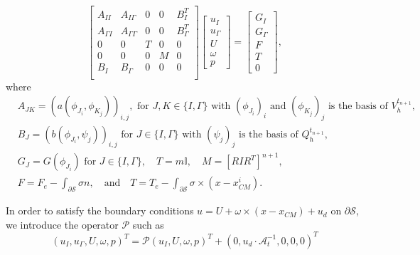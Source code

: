 \documentclass[graybox]{svmult}
\newcommand{\Vel}{u} %
\newcommand{\Pres}{p} %
\newcommand{\tvel}{U} %
\newcommand{\angvel}{\omega} %
\newcommand{\CenterMassi}{x_{CM}^i}
\newcommand{\Solid}{\mathcal{S}} %
\newcommand{\normal}{n} %
\begin{document}
\begin{equation}
	\begin{bmatrix}
		A_{II} & A_{I\Gamma} & 0 & 0 & B_{I}^T  \\
		A_{\Gamma I} & A_{\Gamma \Gamma}  & 0 & 0 & B_{\Gamma}^T\\
		0 & 0 & T
		& 0 & 0 \\
		0 & 0 & 0& M
		& 0\\
		B_I & B_\Gamma & 0 & 0 & 0   \\
	\end{bmatrix}
	\begin{bmatrix}
		\Vel_I \\ \Vel_\Gamma \\ \tvel \\ \angvel \\ \Pres 
	\end{bmatrix} 
	= 
	\begin{bmatrix}
		G_I \\
		G_{\Gamma}\\
		F
		\\
		T
		\\
		0
	\end{bmatrix},
	\label{Eq:flu-rig-block}
\end{equation} 
\color{black}
where
\begin{align*}
&A_{JK} =	(a(\phi_{J_{i}},\phi_{K_{j}}))_{i,j},   \textrm{ for } J,K \in \{I,\Gamma\}  \textrm{ with $(\phi_{J_{i}})_i$ and $( \phi_{K_{j}} )_j$ is the basis of $V_h^{t_{n+1}}$},\\
&B_J = (b(\phi_{J_{i}},\psi_{j}))_{i,j} \textrm{ for } J \in \{I,\Gamma\} \textrm{ with $(\psi_j)_j$ is the basis of $Q_h^{t_{n+1}}$},\\
&G_J = G(\phi_{J_{i}}) \textrm{ for } J \in \{I,\Gamma\}, \quad T = m\mathbb{I}, \quad M = [RIR^T]^{n+1},\\
&F = F_e - \int_{\partial \Solid} \sigma \normal, \quad \textrm{and} \quad T = T_e -\int_{\partial \Solid} \sigma \times (x-\CenterMassi).
\end{align*}



In order to satisfy the boundary conditions $\Vel = \tvel+ \angvel \times (x-x_{CM}) + u_d$ on  $\partial \Solid$, we introduce the operator $\mathcal{P}$ such as 
\begin{equation}
\label{eq:boundary_constraint}
 (\Vel_I,\Vel_\Gamma,\tvel,\angvel,p)^T = \mathcal{P}	(\Vel_I,\tvel,\angvel,p)^T + (0,u_d\cdot\mathcal{A}_t^{-1},0,0,0)^T 
\end{equation}
\end{document}
